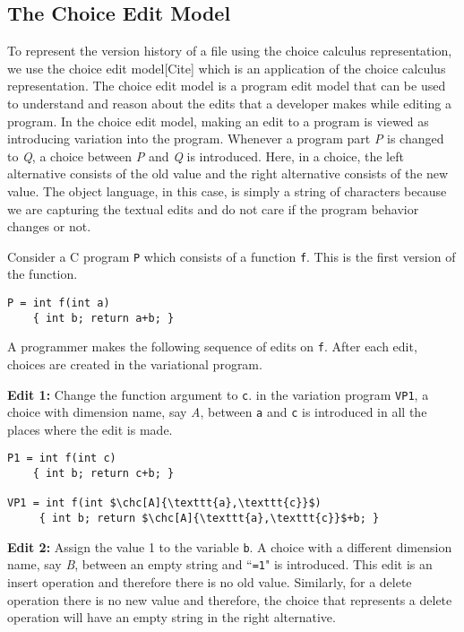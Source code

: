 \subsection{The Choice Edit Model}

To represent the version history of a file using the choice calculus representation, we use the choice edit model[Cite] which is an application of the choice calculus representation. The choice edit model is a program edit model that can be used to understand and reason about the edits that a developer makes while editing a program. In the choice edit model, making an edit to a program is viewed as introducing variation into the program. Whenever a program part \textit{P} is changed to \textit{Q}, a choice between \textit{P} and \textit{Q} is introduced. Here, in a choice, the left alternative consists of the old value and the right alternative consists of the new value. %
The object language, in this case, is simply a string of characters because we are capturing the textual edits and do not care if the program behavior changes or not.

Consider a C program \texttt{P} which consists of a function \texttt{f}. This is the first version of the function. %

\begin{lstlisting} 
P = int f(int a)
    { int b; return a+b; }
\end{lstlisting}    


A programmer makes the following sequence of edits on \texttt{f}. After each edit, choices are created in the variational program.

\textbf{Edit 1:} Change the function argument to \texttt{c}. in the variation program \texttt{VP1}, a choice with dimension name, say \textit{A}, between \texttt{a} and \texttt{c} is introduced in all the places where the edit is made.

\begin{lstlisting}
P1 = int f(int c)
    { int b; return c+b; }
    
VP1 = int f(int $\chc[A]{\texttt{a},\texttt{c}}$)
     { int b; return $\chc[A]{\texttt{a},\texttt{c}}$+b; }
\end{lstlisting}

\textbf{Edit 2:} Assign the value 1 to the variable \texttt{b}. A choice with a different dimension name, say \textit{B}, between an empty string and ``\texttt{=1}" is introduced. This edit is an insert operation and therefore there is no old value. Similarly, for a delete operation there is no new value and therefore, the choice that represents a delete operation will have an empty string in the right alternative.

